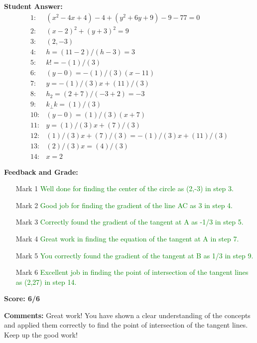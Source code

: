 \documentclass{article}
\begin{document}
\textbf{Student Answer:}
\begin{align*}
1: & (x^{2}-4x+4)-4+(y^{2}+6y+9)-9-77=0 \\
2: & (x-2)^{2}+(y+3)^{2}=9 \\
3: & (2,-3) \\
4: & h=(11-2)/(h-3)=3 \\
5: & k!=-(1)/(3) \\
6: & (y-0)=-(1)/(3)(x-11) \\
7: & y=-(1)/(3)x+(11)/(3) \\
8: & h_2=(2+7)/(-3+2)=-3 \\
9: & k_\perp k=(1)/(3) \\
10: & (y-0)=(1)/(3)(x+7) \\
11: & y=(1)/(3)x+(7)/(3) \\
12: & (1)/(3)x+(7)/(3)=-(1)/(3)x+(11)/(3) \\
13: & (2)/(3)x=(4)/(3) \\
14: & x=2
\end{align*}

\textbf{Feedback and Grade:}
\begin{itemize}
\item[Mark 1] \textcolor{green}{Well done for finding the center of the circle as (2,-3) in step 3.}
\item[Mark 2] \textcolor{green}{Good job for finding the gradient of the line AC as 3 in step 4.}
\item[Mark 3] \textcolor{green}{Correctly found the gradient of the tangent at A as -1/3 in step 5.}
\item[Mark 4] \textcolor{green}{Great work in finding the equation of the tangent at A in step 7.}
\item[Mark 5] \textcolor{green}{You correctly found the gradient of the tangent at B as 1/3 in step 9.}
\item[Mark 6] \textcolor{green}{Excellent job in finding the point of intersection of the tangent lines as (2,27) in step 14.}
\end{itemize}

\textbf{Score: 6/6}

\textbf{Comments:} Great work! You have shown a clear understanding of the concepts and applied them correctly to find the point of intersection of the tangent lines. Keep up the good work!
\end{document}
